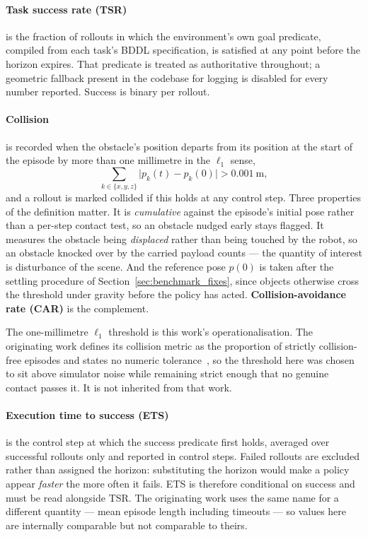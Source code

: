\paragraph{Task success rate (TSR)} is the fraction of rollouts in which the environment's own goal
predicate, compiled from each task's BDDL specification, is satisfied at any point before the
horizon expires. That predicate is treated as authoritative throughout; a geometric fallback
present in the codebase for logging is disabled for every number reported. Success is binary per
rollout.

\paragraph{Collision} is recorded when the obstacle's position departs from its position at the
start of the episode by more than one millimetre in the $\ell_1$ sense,
\begin{equation}
  \sum_{k \in \{x,y,z\}} \bigl| p_k(t) - p_k(0) \bigr| > 0.001~\mathrm{m},
  \label{eq:collision}
\end{equation}
and a rollout is marked collided if this holds at any control step. Three properties of the
definition matter. It is \emph{cumulative} against the episode's initial pose rather than a
per-step contact test, so an obstacle nudged early stays flagged. It measures the obstacle being
\emph{displaced} rather than being touched by the robot, so an obstacle knocked over by the carried
payload counts --- the quantity of interest is disturbance of the scene. And the reference pose
$p(0)$ is taken after the settling procedure of Section~\ref{sec:benchmark_fixes}, since objects
otherwise cross the threshold under gravity before the policy has acted.
\textbf{Collision-avoidance rate (CAR)} is the complement.

The one-millimetre $\ell_1$ threshold is this work's operationalisation. The originating work
defines its collision metric as the proportion of strictly collision-free episodes and states no
numeric tolerance~\cite{vlsa2026}, so the threshold here was chosen to sit above simulator noise
while remaining strict enough that no genuine contact passes it. It is not inherited from that
work.

\paragraph{Execution time to success (ETS)} is the control step at which the success predicate
first holds, averaged over successful rollouts only and reported in control steps. Failed rollouts
are excluded rather than assigned the horizon: substituting the horizon would make a policy appear
\emph{faster} the more often it fails. ETS is therefore conditional on success and must be read
alongside TSR. The originating work uses the same name for a different quantity --- mean episode
length including timeouts --- so values here are internally comparable but not comparable to
theirs.

